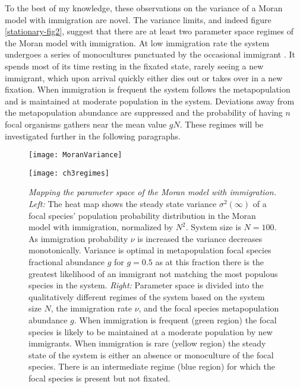 To the best of my knowledge, these observations on the variance of a Moran model with immigration are novel. 
The variance limits, and indeed figure \ref{stationary-fig2}, suggest that there are at least two parameter space regimes of the Moran model with immigration. 
At low immigration rate the system undergoes a series of monocultures punctuated by the occasional immigrant \cite{Desai2007}. 
It spends most of its time resting in the fixated state, rarely seeing a new immigrant, which upon arrival quickly either dies out or takes over in a new fixation. 
When immigration is frequent the system follows the metapopulation and is maintained at moderate population in the system. 
Deviations away from the metapopulation abundance are suppressed and the probability of having $n$ focal organisms gathers near the mean value $g N$. 
%
These regimes will be investigated further in the following paragraphs. 

\begin{figure}[h]
	\centering
	\begin{minipage}{0.49\linewidth}
		\centering
		\texttt{[image: MoranVariance]}
	\end{minipage}
	\begin{minipage}{0.49\linewidth}
		\centering
		\texttt{[image: ch3regimes]}
	\end{minipage}
	\caption{\emph{Mapping the parameter space of the Moran model with immigration.}
		\emph{Left:} The heat map shows the steady state variance $\sigma^2(\infty)$ of a focal species' population probability distribution in the Moran model with immigration, normalized by $N^2$. System size is $N=100$. As immigration probability $\nu$ is increased the variance decreases monotonically. Variance is optimal in metapopulation focal species fractional abundance $g$ for $g=0.5$ as at this fraction there is the greatest likelihood of an immigrant not matching the most populous species in the system. 
		\emph{Right:} Parameter space is divided into the qualitatively different regimes of the system based on the system size $N$, the immigration rate $\nu$, and the focal species metapopulation abundance $g$. When immigration is frequent (green region) the focal species is likely to be maintained at a moderate population by new immigrants. When immigration is rare (yellow region) the steady state of the system is either an absence or monoculture of the focal species. There is an intermediate regime (blue region) for which the focal species is present but not fixated. 
	} \label{biodiversity-regimes}
\end{figure}

